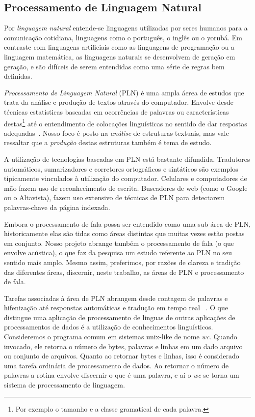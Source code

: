 \documentclass[12pt]{article}
\begin{document}
\subsection{Processamento de Linguagem Natural}

Por \emph{linguagem natural} entende-se linguagens utilizadas por seres humanos para a comunicação cotidiana, linguagens como o português, o inglês ou o yorubá. Em contraste com linguagens artificiais como as linguagens de programação ou a linguagem matemática, as linguagens naturais se desenvolvem de geração em geração, e são difíceis de serem entendidas como uma série de regras bem definidas.

\emph{Processamento de Linguagem Natural} (PLN) é uma ampla áerea de estudos que trata da análise e produção de textos através do computador. Envolve desde técnicas estatísticas baseadas em ocorrências de palavras ou características destas\footnote{Por exemplo o tamanho e a classe gramatical de cada palavra.} até o entendimento de colocações linguísticas no sentido de dar respostas adequadas~\cite{livro-nltk}. Nosso foco é posto na \emph{análise} de estruturas textuais, mas vale ressaltar que a \emph{produção} destas estruturas também é tema de estudo.

A utilização de tecnologias baseadas em PLN está bastante difundida. Tradutores automáticos, sumarizadores e corretores ortográficos e sintáticos são exemplos tipicamente vinculados à utilização do computador. Celulares e computadores de mão fazem uso de reconhecimento de escrita. Buscadores de web (como o Google ou o Altavista), fazem uso extensivo de técnicas de PLN para detectarem palavras-chave da página indexada.

Embora o processamento de fala possa ser entendido como uma sub-área de PLN, historicamente elas são tidas como áreas distintas que muitas vezes estão postas em conjunto. Nosso projeto abrange também o processamento de fala (o que envolve acústica), o que faz da pesquisa um estudo referente ao PLN no seu sentido mais amplo. Mesmo assim, preferimos, por razões de clareza e tradição das diferentes áreas, discernir, neste trabalho, as áreas de PLN e processamento de fala.

Tarefas associadas à área de PLN abrangem desde contagem de palavras e hifenização até responstas automáticas e tradução em tempo real ~\cite{Jurafsky}. O que distingue uma aplicação de processamento de linguas de outras aplicações de processamentos de dados é a utilização de conhecimentos linguísticos. Consideremos o programa comum em sistemas unix-like de nome \emph{wc}. Quando invocado, ele retorna o número de bytes, palavras e linhas em um dado arquivo ou conjunto de arquivos. Quanto ao retornar bytes e linhas, isso é considerado uma tarefa ordinária de processamento de dados. Ao retornar o número de palavras a rotina envolve discernir o que é uma palavra, e aí o \emph{wc} se torna um sistema de processamento de linguagem.
\end{document}
